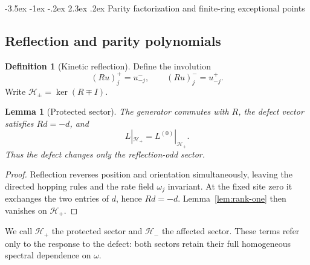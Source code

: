\documentclass[twoside,10pt]{article}
\makeatletter
\numberwithin{equation}{section}
\theoremstyle{slbody}
\newtheorem{lemma}[theorem]{Lemma}
\theoremstyle{definition}
\newtheorem{definition}[theorem]{Definition}
\theoremstyle{remark}
\renewcommand{\section}{%
  \@startsection{section}{1}{\z@}%
    {-3.5ex \@plus -1ex \@minus -.2ex}%
    {2.3ex \@plus .2ex}%
    {\normalfont\large\bfseries}}
\makeatother
\begin{document}
\section{Parity factorization and finite-ring exceptional points}
\label{sec:parity}

\subsection{Reflection and parity polynomials}

\begin{definition}[Kinetic reflection]\label{def:reflection}
Define the involution
\[
 (Ru)^+_j=u^-_{-j},\qquad (Ru)^-_j=u^+_{-j}.
\]
Write $\mathcal H_\pm=\ker(R\mp I)$.
\end{definition}

\begin{lemma}[Protected sector]\label{lem:protected-sector}
The generator commutes with $R$, the defect vector satisfies $Rd=-d$,
and
\[
 L|_{\mathcal H_+}=L^{(0)}|_{\mathcal H_+}.
\]
Thus the defect changes only the reflection-odd sector.
\end{lemma}

\begin{proof}
Reflection reverses position and orientation simultaneously, leaving the
directed hopping rules and the rate field $\omega_j$ invariant.  At the
fixed site zero it exchanges the two entries of $d$, hence $Rd=-d$.
Lemma~\ref{lem:rank-one} then vanishes on $\mathcal H_+$.
\end{proof}

We call $\mathcal H_+$ the protected sector and $\mathcal H_-$ the
affected sector.  These terms refer only to the response to the defect:
both sectors retain their full homogeneous spectral dependence on
$\omega$.
\end{document}

